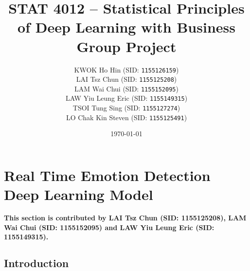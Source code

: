\documentclass[11pt,a4paper]{article}
\begin{document}
    
    \thispagestyle{empty}
    \title{\textsc{STAT 4012} -- Statistical Principles of Deep Learning with Business \\ Group Project}
    \author{
        KWOK Ho Hin (SID: \texttt{1155126159}) \\
        LAI Tsz Chun (SID: \texttt{1155125208}) \\
        LAM Wai Chui (SID: \texttt{1155152095}) \\
        LAW Yiu Leung Eric (SID: \texttt{1155149315}) \\
        TSOI Tung Sing (SID: \texttt{1155127274}) \\
        LO Chak Kin Steven (SID: \texttt{1155125491})
    }
    \date{\today}
    \maketitle
    
    \tableofcontents
    \thispagestyle{empty}
    \newpage
    
    \setcounter{page}{1}
    
    \section{Real Time Emotion Detection Deep Learning Model}
    \textbf{This section is contributed by LAI Tsz Chun (SID: 1155125208), LAM Wai Chui (SID: 1155152095) and LAW Yiu Leung Eric (SID: 1155149315).}
    
    \subsection{Introduction}
    
\end{document}
